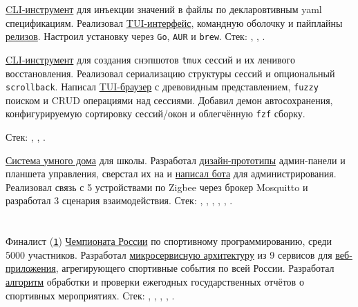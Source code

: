 \documentclass[margin,line]{resume}
\begin{document}
\begin{resume}
\begin{description}[leftmargin=0pt, itemindent=*, itemsep=8pt]
    \item[Devsyringe:]
      \href{https://devsyringe.alchemmist.xyz/}{CLI-инструмент} для
      инъекции значений в файлы по декларовтивным yaml спецификациям.
      Реализовал
      \href{https://github.com/alchemmist/devsyringe/blob/main/internal/cli/tui/tui.go}{TUI-интерфейс},
      командную оболочку и пайплайны
      \href{https://github.com/alchemmist/devsyringe/blob/main/.github/workflows/release.yaml}{релизов}.
      Настроил установку через \texttt{Go}, \texttt{AUR} и \texttt{brew}.
      Стек: , , .

    \item[lazy-tmux:]
      \href{https://lazy-tmux.xyz}{CLI-инструмент} для
      создания снэпшотов \texttt{tmux} сессий и их ленивого восстановления.
      Реализовал сериализацию структуры сессий и
      опциональный \texttt{scrollback}. Написал
      \href{https://github.com/alchemmist/lazy-tmux}{TUI-браузер}
      с древовидным представлением, \texttt{fuzzy} поиском и CRUD
      операциями над сессиями. Добавил демон автосохранения,
      конфигурируемую сортировку сессий/окон и облегчённую \texttt{fzf} сборку.

      Стек: , ,
      .

    \item[SmartCab:] \href{https://github.com/smart-cab}{Система
      умного дома} для школы.
      Разработал
      \href{https://www.figma.com/design/8H1tFpxgmIDV1xp06ndi73/SmartCab}{дизайн-прототипы}
      админ-панели и планшета управления,
      сверстал их на  и
      \href{https://github.com/smart-cab/smartcab-bot}{написал бота}
      для администрирования.
      Реализовал связь с 5 устройствами по Zigbee через брокер
      Mosquitto и разработал 3 сценария взаимодействия.
      Стек: , ,
      , ,
      , .

  \end{description}

  \section{}
  Финалист
  (\href{https://alchemmist.github.io/CV/attachments/russian-chemp-final.pdf}{\texttt{1}})
  \href{https://events.fsp-russia.com/championship}{Чемпионата
  России} по спортивному программированию, среди 5000 участников. Разработал
  \href{https://alchemmist.github.io/CV/attachments/architect.pdf}{микросервисную
  архитектуру} из 9 сервисов для
  \href{https://github.com/alchemmist/sportprog}{веб-приложения},
  агрегирующего спортивные события по
  всей России. Разработал
  \href{https://github.com/alchemmist/sport-afisha/blob/main/event_parsing_service/parse_pdf.py}{алгоритм}
  обработки и проверки ежегодных
  государственных
  отчётов о спортивных мероприятиях. Стек:
  , ,
  ,
  ,
  .


\end{resume}
\end{document}
